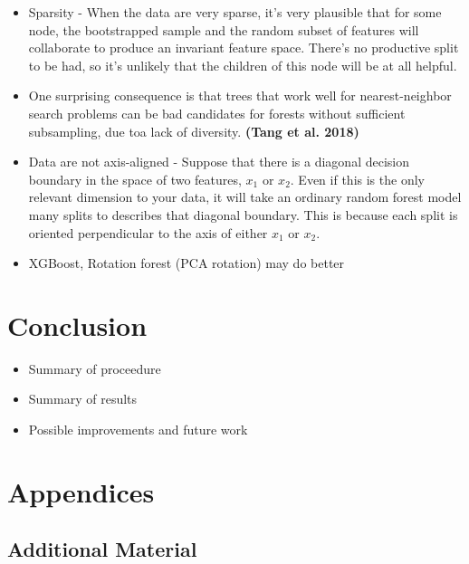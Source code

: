 \documentclass[12pt,]{article}
\providecommand{\tightlist}{%
  \setlength{\itemsep}{0pt}\setlength{\parskip}{0pt}}
\begin{document}
\begin{itemize}
\item
  Sparsity - When the data are very sparse, it's very plausible that for
  some node, the bootstrapped sample and the random subset of features
  will collaborate to produce an invariant feature space. There's no
  productive split to be had, so it's unlikely that the children of this
  node will be at all helpful.
\item
  One surprising consequence is that trees that work well for
  nearest-neighbor search problems can be bad candidates for forests
  without sufficient subsampling, due toa lack of diversity.
  \textbf{(Tang et al. 2018)}
\item
  Data are not axis-aligned - Suppose that there is a diagonal decision
  boundary in the space of two features, \(x_1\) or \(x_2\). Even if
  this is the only relevant dimension to your data, it will take an
  ordinary random forest model many splits to describes that diagonal
  boundary. This is because each split is oriented perpendicular to the
  axis of either \(x_1\) or \(x_2\).
\item
  XGBoost, Rotation forest (PCA rotation) may do better
\end{itemize}

\newpage

\section{Conclusion}\label{conclusion}

\begin{itemize}
\tightlist
\item
  Summary of proceedure
\item
  Summary of results
\item
  Possible improvements and future work
\end{itemize}

\newpage

\section{Appendices}\label{appendices}

\subsection{Additional Material}\label{additional-material}
\end{document}
